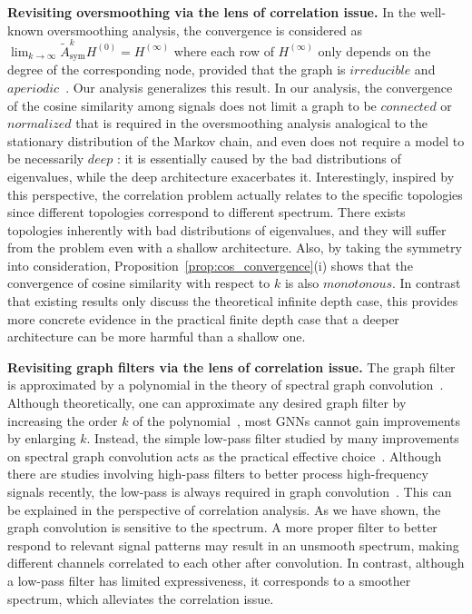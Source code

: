\documentclass[nohyperref]{article}
\theoremstyle{plain}
\theoremstyle{definition}
\theoremstyle{remark}
\begin{document}
\textbf{Revisiting oversmoothing via the lens of correlation issue.}
In the well-known oversmoothing analysis, the convergence is considered as $\lim _{k\rightarrow\infty} \tilde A_{\mathrm{sym}}^k H^{(0)}=H^{(\infty)}$ where each row of $H^{(\infty)}$ only depends on the
degree of the corresponding node, provided that the graph is $irreducible$ and $aperiodic$~\cite{xu2018representation,liu2020towards,zhao2020pairnorm,chien2021adaptive}.
Our analysis generalizes this result.
In our analysis, the convergence of the cosine similarity among signals does not limit a graph to be $connected$ or $normalized$ that is required in the oversmoothing analysis analogical to the stationary distribution of the Markov chain, and even does not require a model to be necessarily $deep$ :
it is essentially caused by the bad distributions of eigenvalues, while the deep architecture exacerbates it.
Interestingly, inspired by this perspective, the correlation problem actually relates to the specific topologies since different topologies correspond to different spectrum.
There exists topologies inherently with bad distributions of eigenvalues, and they will suffer from the problem even with a shallow architecture.
Also, by taking the symmetry into consideration, Proposition~\ref{prop:cos_convergence}(i) shows that the convergence of cosine similarity with respect to $k$ is also $monotonous$.
In contrast that existing results only discuss the theoretical infinite depth case, this provides more concrete evidence in the practical finite depth case that a deeper architecture can be more harmful than a shallow one.

\textbf{Revisiting graph filters via the lens of correlation issue.}
The graph filter is approximated by a polynomial in the theory of spectral graph convolution~\cite{hammond2011wavelets,defferrard2016convolutional}. Although theoretically, one can approximate any desired graph filter by increasing the order $k$ of the polynomial~\cite{shuman2013emerging}, most GNNs cannot gain improvements by enlarging $k$. Instead, the simple low-pass filter studied by many improvements on spectral graph convolution acts as the practical effective choice~\cite{shuman2013emerging,pmlr-v97-wu19e,1905.09550,muhammet2020spectral,klicpera2019diffusion}. Although there are studies involving high-pass filters to better process high-frequency signals recently, the low-pass is always required in graph convolution~\cite{zhu2020simple,zhu2021interpreting,balcilar2021analyzing,fagcn2021,gao2021message}. This can be explained in the perspective of correlation analysis. As we have shown, the graph convolution is sensitive to the spectrum. A more proper filter to better respond to relevant signal patterns may result in an unsmooth spectrum, making different channels correlated to each other after convolution. In contrast, although a low-pass filter has limited expressiveness, it corresponds to a smoother spectrum, which alleviates the correlation issue.
\end{document}
